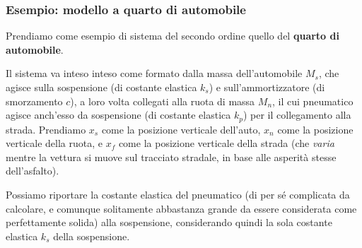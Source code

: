 \documentclass[a4paper,11pt]{article}
\begin{document}
\subsubsection{Esempio: modello a quarto di automobile}
Prendiamo come esempio di sistema del secondo ordine quello del \textbf{quarto di automobile}.

Il sistema va inteso inteso come formato dalla massa dell'automobile $M_s$, che agisce sulla sospensione (di costante elastica $k_s$) e sull'ammortizzatore (di smorzamento $c$), a loro volta collegati alla ruota di massa $M_n$, il cui pneumatico agisce anch'esso da sospensione (di costante elastica $k_p$) per il collegamento alla strada.
Prendiamo $x_s$ come la posizione verticale dell'auto, $x_n$ come la posizione verticale della ruota, e $x_f$ come la posizione verticale della strada (che \textit{varia} mentre la vettura si muove sul tracciato stradale, in base alle asperità stesse dell'asfalto).

Possiamo riportare la costante elastica del pneumatico (di per sé complicata da calcolare, e comunque solitamente abbastanza grande da essere considerata come perfettamente solida) alla sospensione, considerando quindi la sola costante elastica $k_s$ della sospensione.
\end{document}
